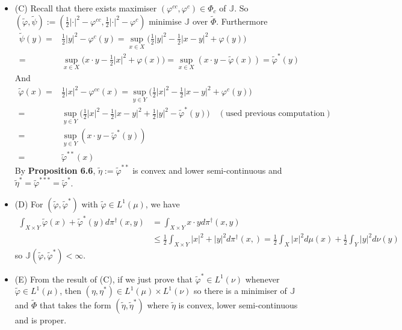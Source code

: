 \documentclass[10pt,a4paper]{article}
\renewenvironment{i}
{\begin{itemize} 
	}%
	{\end{itemize}
}
\begin{document}
\begin{i}
\item[(C)] Recall that there exists maximiser $(\varphi^{cc}, \varphi^c)\in \Phi_c$ of $\mathbb{J}$. So $(\tilde{\varphi}, \tilde{\psi}) := (\frac{1}{2}|\cdot|^2 - \varphi^{cc}, \frac{1}{2}|\cdot|^2 - \varphi^c)$ minimise $\mathbb{J}$ over $\tilde{\Phi}$. Furthermore
\begin{align*}
\tilde{\psi}(y) =& \frac{1}{2}|y|^2 - \varphi^c(y) = \sup_{x\in X} \big( \frac{1}{2} |y|^2 - \frac{1}{2}|x-y|^2 + \varphi(y) \big) \\
=& \sup_{x\in X} \big( x\cdot y -\frac{1}{2} |x|^2 + \varphi(x) \big) = \sup_{x\in X} (x\cdot y - \tilde{\varphi}(x)) = \tilde{\varphi}^*(y)
\end{align*}
And
\begin{align*}
\tilde{\varphi}(x) =& \frac{1}{2} |x|^2 - \varphi^{cc}(x) = \sup_{y\in Y} \big( \frac{1}{2} |x|^2 - \frac{1}{2} |x-y|^2 + \varphi^c (y) \big) \\
=& \sup_{y\in Y}\big( \frac{1}{2}|x|^2 - \frac{1}{2}|x-y|^2 + \frac{1}{2}|y|^2 - \tilde{\varphi}^*(y) \big) \quad (\text{used previous computation}) \\
=& \sup_{y\in Y} (x\cdot y - \tilde{\varphi}^*(y)) \\
=& \tilde{\varphi}^{**}(x)
\end{align*}
By \textbf{Proposition 6.6}, $\tilde{\eta} := \tilde{\varphi}^{**}$ is convex and lower semi-continuous and $\tilde{\eta}^* = \tilde{\varphi}^{***} = \tilde{\varphi}^*$. 
\item[(D)] For $(\tilde{\varphi}, \tilde{\varphi}^*)$ with $\tilde{\varphi} \in L^1(\mu)$, we have
\begin{align*}
\int_{X\times Y} \tilde{\varphi}(x) + \tilde{\varphi}^* (y) d\pi^{\dagger}(x,y) & = \int_{X\times Y} x\cdot y d\pi^{\dagger}(x,y) \\
& \leq \frac{1}{2} \int_{X\times Y} |x|^2 + |y|^2 d\pi^{\dagger} (x,) =\frac{1}{2} \int_X |x|^2 d\mu(x) + \frac{1}{2} \int_Y |y|^2 d\nu(y)
\end{align*}
so $\mathbb{J}(\tilde{\varphi}, \tilde{\varphi}^*) < \infty$.
\item[(E)] From the result of (C), if we just prove that $\tilde{\varphi}^* \in L^1(\nu)$ whenever $\tilde{\varphi} \in L^1(\mu)$, then $(\eta, \eta^*) \in L^1(\mu) \times L^1(\nu)$ so there is a minimiser of $\mathbb{J}$ and $\tilde{\Phi}$ that takes the form $(\tilde{\eta}, \tilde{\eta}^*)$ where $\tilde{\eta}$ is convex, lower semi-continuous and is proper.
\s


\end{i}
\end{document}
